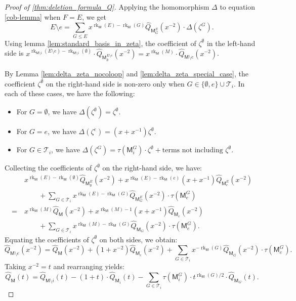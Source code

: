 \documentclass[11pt, a4paper, english]{amsart}
\theoremstyle{teoremas}
\theoremstyle{definition}
\DeclareMathOperator{\rk}{rk}
\newcommand{\M}{\mathsf{M}}
\begin{document}
\begin{proof}[Proof of \ref{thm:deletion_formula_Q}]
    Applying the homomorphism $\Delta$ to equation \ref{cob-lemma}
    when $F = E$, we get
    \[E\setminus e = \sum_{G \leq E} x^{\rk_{\M}(E) - \rk_{\M}(G)} \hat{Q}_{\M_G^E}(x^{-2}) \cdot \Delta(\zeta^G).\]
    Using lemma \ref{lem:standard_basis_in_zeta}, the coefficient of $\zeta^\emptyset$ in the left-hand side is
    $x^{\rk_{\M\setminus i}(E\setminus e) - \rk_{\M\setminus i}(\emptyset)}\cdot
        \hat{Q}_{\M_\emptyset^{E\setminus e}}(x^{-2}) = x^{\rk_{\M}(M)}\cdot
        \hat{Q}_{\M\setminus e}(x^{-2})$.

    By Lemma \ref{lem:delta_zeta_nocoloop} and \ref{lem:delta_zeta_special_case}, the coefficient $\zeta^\emptyset$ on the right-hand side is non-zero only when $G\in \{\emptyset, e\} \cup \mathscr{T}_i$. In each of these cases, we have the following:
    \begin{itemize}
        \item For $G = \emptyset$, we have $\Delta(\zeta^\emptyset) = \zeta^\emptyset$.
        \item For $G = e$, we have $\Delta(\zeta^e) = (x+x^{-1})\zeta^\emptyset$.
        \item For $G\in \mathscr{T}_i$, we have $\Delta(\zeta^G) = \tau(\M^G_i)\cdot\zeta^\emptyset
                  +\text{terms not including $\zeta^\emptyset$}$.
    \end{itemize}

    Collecting the coefficients of
    $\zeta^\emptyset$ on the right-hand side, we have:
    \begin{align*}
            & x^{\rk_{\M}(E) - \rk_{\M}(\emptyset)}
        \hat{Q}_{\M_\emptyset^E}(x^{-2}) + x^{\rk_{\M}(E) - \rk_{\M}(e)}(x+x^{-1})
        \hat{Q}_{\M_e^E}(x^{-2})                                               \\
            & \qquad + \sum_{G\in \mathscr{T}_i} x^{\rk_{\M}(E) - \rk_{\M}(G)}
        \hat{Q}_{\M_G^E}(x^{-2})\cdot \tau(\M^G_e)                             \\
        =\  & x^{\rk_{\M}(M)}
        \hat{Q}_{\M}(x^{-2}) + x^{\rk_{\M}(M) - 1}(x+x^{-1})
        \hat{Q}_{\M_e}(x^{-2})                                                 \\
            & \qquad + \sum_{G\in \mathscr{T}_i} x^{\rk_{\M}(M) - \rk_{\M}(G)}
        \hat{Q}_{\M_G}(x^{-2})\cdot \tau(\M^G_e).
    \end{align*}
    Equating the coefficients of $\zeta^\emptyset$ on both sides, we obtain:
    \[\hat{Q}_{\M\setminus e}(x^{-2}) = \hat{Q}_{\M}(x^{-2}) + (1+x^{-2})
        \hat{Q}_{\M_e}(x^{-2}) + \sum_{G\in \mathscr{T}_i} x^{- \rk_{\M}(G)}
        \hat{Q}_{\M_G}(x^{-2})\cdot \tau(\M^G_e).\]
    Taking $x^{-2} = t$ and rearranging yields:
    \begin{equation}
        \hat{Q}_{\M}(t) = \hat{Q}_{\M\setminus i}(t) -(1 + t)\cdot \hat{Q}_{\M_i}(t) -
        \sum_{G \in \mathscr{T}_i}{\tau(\M^G_i)\cdot t^{\rk_{\M}(G)/2}\cdot
            \hat{Q}_{\M_G}(t)}.
    \end{equation}


\end{proof}
\end{document}
